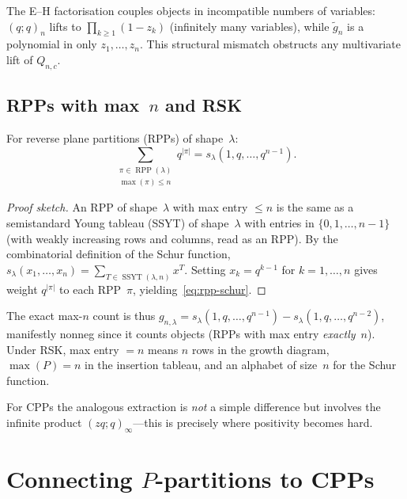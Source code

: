 \documentclass[11pt]{article}
\theoremstyle{plain}
\theoremstyle{definition}
\theoremstyle{remark}
\newcommand{\RPP}{\operatorname{RPP}}
\newcommand{\SSYT}{\operatorname{SSYT}}
\newcommand{\qpochn}[3]{(#1;#2)_{#3}}
\begin{document}
The E--H factorisation couples objects in incompatible
numbers of variables: $\qpochn{q}{q}{n}$ lifts to
$\prod_{k \geq 1}(1 - z_k)$ (infinitely many variables),
while $\tilde{g}_n$ is a polynomial in only $z_1, \ldots, z_n$.
This structural mismatch obstructs any multivariate lift of
$Q_{n,c}$.

\subsection{RPPs with max~$n$ and RSK}

For reverse plane partitions (RPPs) of shape~$\lambda$:
\begin{equation}\label{eq:rpp-schur}
  \sum_{\substack{\pi \in \RPP(\lambda) \\ \max(\pi) \leq n}}
  q^{|\pi|}
  = s_\lambda(1, q, \ldots, q^{n-1}).
\end{equation}

\begin{proof}[Proof sketch]
An RPP of shape~$\lambda$ with max entry $\leq n$ is the
same as a semistandard Young tableau (SSYT) of shape~$\lambda$
with entries in $\{0, 1, \ldots, n-1\}$ (with weakly increasing
rows and columns, read as an RPP).
By the combinatorial definition of the Schur function,
$s_\lambda(x_1, \ldots, x_n) = \sum_{T \in \SSYT(\lambda, n)} x^T$.
Setting $x_k = q^{k-1}$ for $k = 1, \ldots, n$ gives weight
$q^{|\pi|}$ to each RPP~$\pi$, yielding~\eqref{eq:rpp-schur}.
\end{proof}

The exact max-$n$ count is thus
$g_{n,\lambda} = s_\lambda(1, q, \ldots, q^{n-1})
- s_\lambda(1, q, \ldots, q^{n-2})$,
manifestly nonneg since it counts objects (RPPs with max
entry \emph{exactly}~$n$).
Under RSK, max entry $= n$ means $n$ rows in the growth diagram,
$\max(P) = n$ in the insertion tableau, and an alphabet of
size~$n$ for the Schur function.

For CPPs the analogous extraction is \emph{not} a simple difference
but involves the infinite product $(zq;q)_\infty$---this is
precisely where positivity becomes hard.


\section{Connecting $P$-partitions to CPPs}
\label{sec:P-part-cpp}
\end{document}
